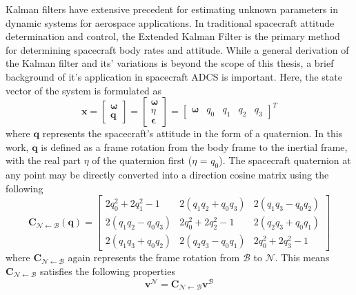 Kalman filters have extensive precedent for estimating unknown parameters in dynamic systems for aerospace applications. In traditional spacecraft attitude determination and control, the Extended Kalman Filter is the primary method for determining spacecraft body rates and attitude. While a general derivation of the Kalman filter and its' variations is beyond the scope of this thesis, a brief background of it's application in spacecraft ADCS is important. Here, the state vector of the system is formulated as
\begin{equation}\label{equation:EKF_state_vec}
    \bm{x} = \begin{bmatrix}\bm{\omega} \\ \bm{q} \end{bmatrix}
    =\begin{bmatrix}
        \bm{\omega} \\ \eta \\ \bm{\epsilon}
    \end{bmatrix}
    =\begin{bmatrix}
        \bm{\omega} & q_0 & q_1 & q_2 & q_3
    \end{bmatrix}^T
\end{equation}
where $\bm{q}$ represents the spacecraft's attitude in the form of a quaternion. In this work, $\bm{q}$ is defined as a frame rotation from the body frame to the inertial frame, with the real part $\eta$ of the quaternion first ($\eta$ = $q_0$). The spacecraft quaternion at any point may be directly converted into a direction cosine matrix using the following
\begin{equation}
    \bm{C}_{\mathcal{N}\leftarrow\mathcal{B}}(\bm{q})=
    \begin{bmatrix}
    2q_0^{2}+2q_1^{2}-1 & 2(q_1 q_2 + q_0 q_3) & 2(q_1 q_3 - q_0 q_2) \\
    2(q_1 q_2 - q_0 q_3) & 2q_0^{2}+2q_2^{2}-1 & 2(q_2 q_3 + q_0 q_1) \\
    2(q_1 q_3 + q_0 q_2) & 2(q_2 q_3 - q_0 q_1) & 2q_0^{2}+2q_3^{2}-1
    \end{bmatrix}
\end{equation}
where $\bm{C}_{\mathcal{N}\leftarrow\mathcal{B}}$ again represents the frame rotation from $\mathcal{B}$ to $\mathcal{N}$. This means $\bm{C}_{\mathcal{N}\leftarrow\mathcal{B}}$ satisfies the following properties
\begin{equation}
    \bm{v}^{\mathcal{N}} = 
    \bm{C}_{\mathcal{N}\leftarrow\mathcal{B}}\bm{v}^{\mathcal{B}}
\end{equation}
